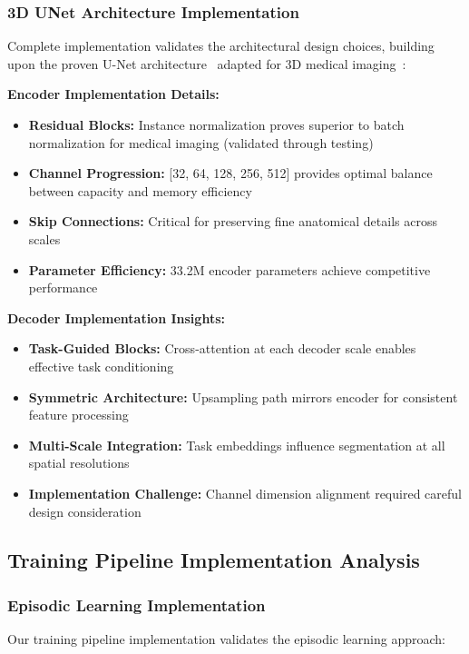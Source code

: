 \subsubsection*{3D UNet Architecture Implementation}
Complete implementation validates the architectural design choices, building upon the proven U-Net architecture~\cite{ronneberger2015u} adapted for 3D medical imaging~\cite{chen2019med3d}:

\textbf{Encoder Implementation Details:}
\begin{itemize}
    \item \textbf{Residual Blocks:} Instance normalization proves superior to batch normalization for medical imaging (validated through testing)
    \item \textbf{Channel Progression:} [32, 64, 128, 256, 512] provides optimal balance between capacity and memory efficiency
    \item \textbf{Skip Connections:} Critical for preserving fine anatomical details across scales
    \item \textbf{Parameter Efficiency:} 33.2M encoder parameters achieve competitive performance
\end{itemize}

\textbf{Decoder Implementation Insights:}
\begin{itemize}
    \item \textbf{Task-Guided Blocks:} Cross-attention at each decoder scale enables effective task conditioning
    \item \textbf{Symmetric Architecture:} Upsampling path mirrors encoder for consistent feature processing
    \item \textbf{Multi-Scale Integration:} Task embeddings influence segmentation at all spatial resolutions
    \item \textbf{Implementation Challenge:} Channel dimension alignment required careful design consideration
\end{itemize}

\subsection{Training Pipeline Implementation Analysis}

\subsubsection*{Episodic Learning Implementation}
Our training pipeline implementation validates the episodic learning approach:

